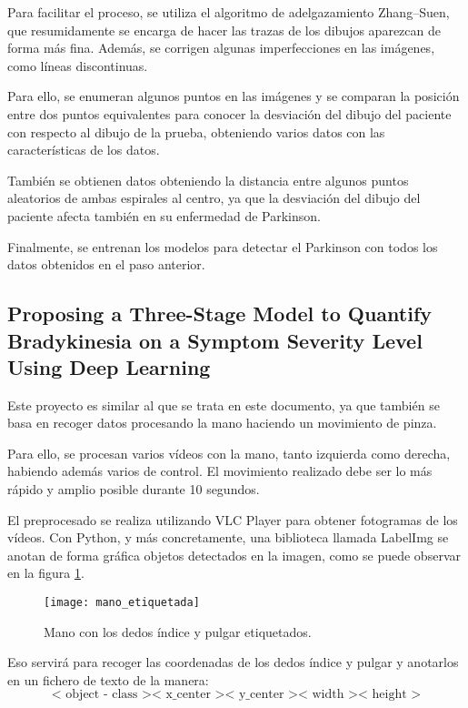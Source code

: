 Para facilitar el proceso, se utiliza el algoritmo de adelgazamiento Zhang–Suen, que resumidamente se encarga de hacer las trazas de los dibujos aparezcan de forma más fina. Además, se corrigen algunas imperfecciones en las imágenes, como líneas discontinuas.

Para ello, se enumeran algunos puntos en las imágenes y se comparan la posición entre dos puntos equivalentes para conocer la desviación del dibujo del paciente con respecto al dibujo de la prueba, obteniendo varios datos con las características de los datos. 

También se obtienen datos obteniendo la distancia entre algunos puntos aleatorios de ambas espirales al centro, ya que la desviación del dibujo del paciente afecta también en su enfermedad de Parkinson.

Finalmente, se entrenan los modelos para detectar el Parkinson con todos los datos obtenidos en el paso anterior.

\subsection{Proposing a Three-Stage Model to Quantify
	Bradykinesia on a Symptom Severity Level
	Using Deep Learning\cite{jaber2021proposing}}
Este proyecto es similar al que se trata en este documento, ya que también se basa en recoger datos procesando la mano haciendo un movimiento de pinza.

Para ello, se procesan varios vídeos con la mano, tanto izquierda como derecha, habiendo además varios de control. El movimiento realizado debe ser lo más rápido y amplio posible durante 10 segundos.

El preprocesado se realiza utilizando VLC Player para obtener fotogramas de los vídeos. Con Python, y más concretamente, una biblioteca llamada LabelImg se anotan de forma gráfica objetos detectados en la imagen, como se puede observar en la figura \ref{manoetiquetada}.

\begin{figure}[]
	\texttt{[image: mano\_etiquetada]}
	\caption{Mano con los dedos índice y pulgar etiquetados.\cite{jaber2021proposing}}
	\label{manoetiquetada}
\end{figure}

Eso servirá para recoger las coordenadas de los dedos índice y pulgar y anotarlos en un fichero de texto de la manera: 
\begin{equation}
	\text{< object - class >< x\_center >< y\_center >< width >< height >}
\end{equation}

